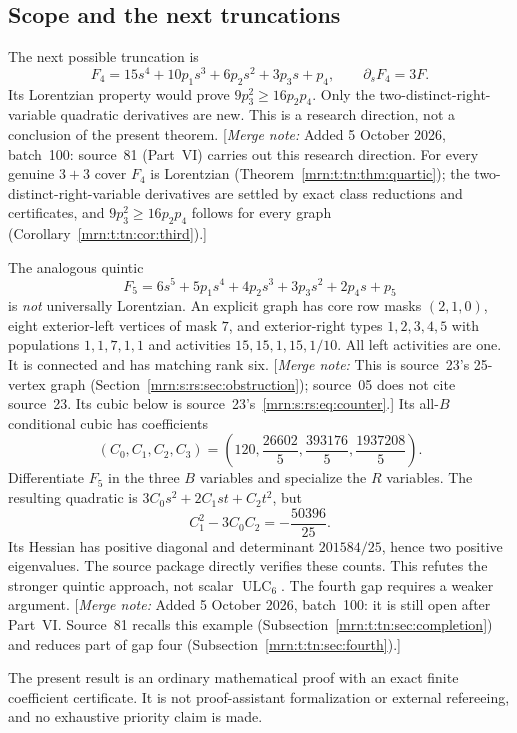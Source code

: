 \documentclass[11pt,a4paper]{article}
\theoremstyle{remark}\newtheorem{remark}[theorem]{Remark}
\newcommand{\ULC}{\operatorname{ULC}}      %
\newcommand{\mnote}[1]{[\textit{Merge note:} #1]}
\begin{document}
\subsection{Scope and the next truncations}\label{mrn:s:sn:sec:scope}
The next possible truncation is
\[
 F_4=15s^4+10p_1s^3+6p_2s^2+3p_3s+p_4,\qquad
 \partial_sF_4=3F.
\]
Its Lorentzian property would prove $9p_3^2\ge16p_2p_4$.
Only the two-distinct-right-variable quadratic derivatives are new.
This is a research direction, not a conclusion of the present theorem.
\mnote{Added 5 October 2026, batch~100: source~81 (Part~VI) carries out this research direction.
For every genuine $3+3$ cover $F_4$ is Lorentzian
(Theorem~\ref{mrn:t:tn:thm:quartic}); the two-distinct-right-variable
derivatives are settled by exact class reductions and certificates, and
$9p_3^2\ge16p_2p_4$ follows for every graph
(Corollary~\ref{mrn:t:tn:cor:third}).}

The analogous quintic
\[
 F_5=6s^5+5p_1s^4+4p_2s^3+3p_3s^2+2p_4s+p_5
\]
is \emph{not} universally Lorentzian. An explicit graph has core row masks
$(2,1,0)$, eight exterior-left vertices of mask $7$, and exterior-right
types $1,2,3,4,5$ with populations $1,1,7,1,1$ and activities
$15,15,1,15,1/10$. All left activities are one. It is connected and has
matching rank six. \mnote{This is source~23's 25-vertex graph (Section~\ref{mrn:s:rs:sec:obstruction}); source~05 does not cite source~23. Its cubic below is source~23's~\eqref{mrn:s:rs:eq:counter}.} Its all-$B$ conditional cubic has coefficients
\[
 (C_0,C_1,C_2,C_3)=
 \left(120,\frac{26602}{5},\frac{393176}{5},\frac{1937208}{5}\right).
\]
Differentiate $F_5$ in the three $B$ variables and specialize the $R$ variables.
The resulting quadratic is $3C_0s^2+2C_1st+C_2t^2$, but
\[
 C_1^2-3C_0C_2=-\frac{50396}{25}.
\]
Its Hessian has positive diagonal and determinant $201584/25$, hence two
positive eigenvalues. The source package directly verifies these counts.
This refutes the stronger quintic approach, not scalar $\ULC_6$.
The fourth gap requires a weaker argument.
\mnote{Added 5 October 2026, batch~100: it is still open after Part~VI. Source~81 recalls this
example (Subsection~\ref{mrn:t:tn:sec:completion}) and reduces part of gap four
(Subsection~\ref{mrn:t:tn:sec:fourth}).}

The present result is an ordinary mathematical proof with an exact finite
coefficient certificate. It is not proof-assistant formalization or external
refereeing, and no exhaustive priority claim is made.

\end{document}
